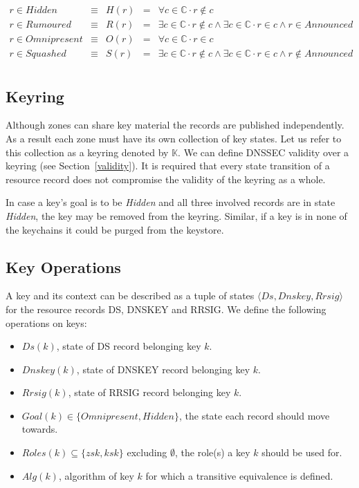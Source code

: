 \documentclass[twoside,english, a4paper]{article}
\begin{document}
\begin{displaymath}
\begin{array}{lllll}
       r\in Hidden      & \equiv & H(r) &=& \forall c \in \mathbb{C} \cdot r \not \in c \\
       r\in Rumoured    & \equiv & R(r) &=& \exists c \in \mathbb{C} \cdot r \not \in c \wedge \exists c \in \mathbb{C} \cdot r\in c \wedge r\in Announced\\
       r\in Omnipresent & \equiv & O(r) &=& \forall c \in \mathbb{C} \cdot r \in c \\
       r\in Squashed    & \equiv & S(r) &=& \exists c \in \mathbb{C} \cdot r \not \in c \wedge \exists c \in \mathbb{C} \cdot r \in c \wedge r \notin Announced \\
\end{array}
\end{displaymath}

\subsection{Keyring}

Although zones can share key material the records are published 
independently. As a result each zone must have its own collection of
key states. Let us refer to this collection as a keyring denoted 
by $\mathbb{K}$. We can
define DNSSEC validity over a keyring (see Section~\ref{validity}).
It is required that every state transition of a resource record does 
not compromise the validity of the keyring as a whole.

In case a key's goal is to be \emph{Hidden} and all three involved
records are in state \emph{Hidden}, the key may be removed from the
keyring. Similar, if a key is in none of the keychains it could be
purged from the keystore.

\subsection{Key Operations}

A key and its context can be described as a tuple of states $\langle 
Ds,Dnskey,Rrsig\rangle$ for the resource records DS, DNSKEY and RRSIG.
We define the following operations on keys:

\begin{itemize}
	\item $Ds(k)$, state of DS record belonging key $k$.
	\item $Dnskey(k)$, state of DNSKEY record belonging key $k$.
	\item $Rrsig(k)$, state of RRSIG record belonging key $k$.
	\item $Goal(k) \in \{Omnipresent, Hidden\}$, the state each record
		should move towards.
	\item $Roles(k) \subseteq \{zsk,ksk\}$ excluding $\emptyset$, the 
		role(s) a key $k$ should be used for.
	\item $Alg(k)$, algorithm of key $k$ for which a transitive equivalence
		is defined.
\end{itemize}
\end{document}
